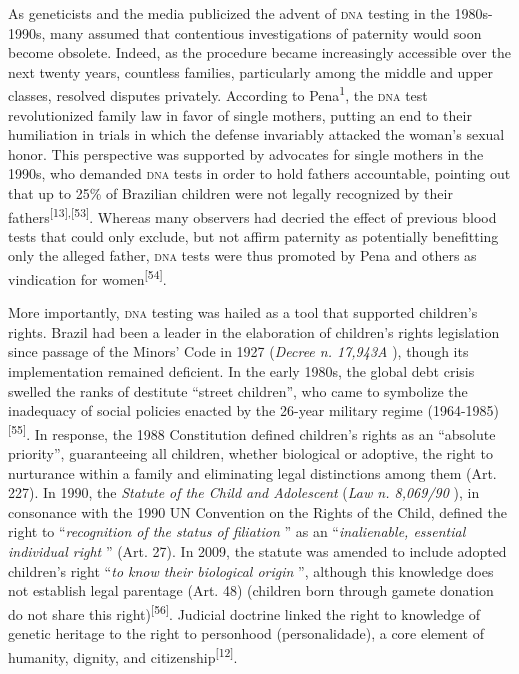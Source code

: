 \documentclass{article}
\begin{document}
As geneticists and the media publicized the advent of \textsc{dna} testing in the
1980s-1990s, many assumed that contentious investigations of paternity would
soon become obsolete. Indeed, as the procedure became increasingly accessible
over the next twenty years, countless families, particularly among the middle
and upper classes, resolved disputes privately. According to Pena\textsuperscript{1}, the \textsc{dna} test revolutionized family law in favor of single mothers, putting an
end to their humiliation in trials in which the defense invariably attacked the
woman’s sexual honor. This perspective was supported by advocates for single
mothers in the 1990s, who demanded \textsc{dna} tests in order to hold fathers
accountable, pointing out that up to 25\% of Brazilian children were not legally
recognized by their fathers\textsuperscript{[}\textsuperscript{13}\textsuperscript{]}\textsuperscript{,}\textsuperscript{[}\textsuperscript{53}\textsuperscript{]}. Whereas many observers had decried the effect of previous blood tests that
could only exclude, but not affirm paternity as potentially benefitting only the
alleged father, \textsc{dna} tests were thus promoted by Pena and others as vindication
for women\textsuperscript{[}\textsuperscript{54}\textsuperscript{]}.

More importantly, \textsc{dna} testing was hailed as a tool that supported children’s
rights. Brazil had been a leader in the elaboration of children’s rights
legislation since passage of the Minors’ Code in 1927 (\textit{Decree n.
17,943A}
), though its implementation remained deficient. In the early 1980s, the global
debt crisis swelled the ranks of destitute “street children”, who came to
symbolize the inadequacy of social policies enacted by the 26-year military
regime (1964-1985)\textsuperscript{[}\textsuperscript{55}\textsuperscript{]}. In response, the 1988 Constitution defined children’s rights as an “absolute
priority”, guaranteeing all children, whether biological or adoptive, the right
to nurturance within a family and eliminating legal distinctions among them
(Art. 227). In 1990, the \textit{Statute of the Child and Adolescent}
(\textit{Law n. 8,069/90}
), in consonance with the 1990 UN Convention on the Rights of the Child, defined
the right to “\textit{recognition of the status of filiation}
” as an “\textit{inalienable, essential individual right}
” (Art. 27). In 2009, the statute was amended to include adopted children’s
right “\textit{to know their biological origin}
”, although this knowledge does not establish legal parentage (Art. 48)
(children born through gamete donation do not share this right)\textsuperscript{[}\textsuperscript{56}\textsuperscript{]}. Judicial doctrine linked the right to knowledge of genetic heritage to the
right to personhood (personalidade), a core element of humanity, dignity, and
citizenship\textsuperscript{[}\textsuperscript{12}\textsuperscript{]}.
\end{document}
